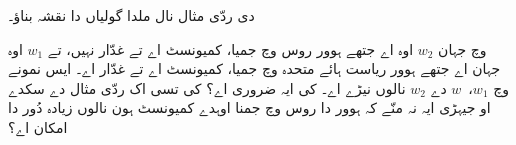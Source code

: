 \documentclass[../../../include/open-logic-section]{subfiles}
\begin{document}
\begin{prob}
 دی ردّی مثال نال ملدا گولیاں دا نقشہ بناؤ۔
\end{prob}

\begin{prob}
   وچ جہان $w_2$ اوہ اے جتھے
  ہوور روس وچ جمیا، کمیونسٹ اے تے غدّار نہیں، تے $w_1$ اوہ جہان اے جتھے
  ہوور ریاست ہائے متحدہ وچ جمیا، کمیونسٹ اے تے غدّار اے۔ ایس نمونے وچ
  $w_1$،~$w$ دے $w_2$ نالوں نیڑے اے۔ کی ایہ ضروری اے؟ کی تسی اک ردّی
  مثال دے سکدے او جیہڑی ایہ نہ منّے کہ ہوور دا روس وچ جمنا اوہدے
  کمیونسٹ ہون نالوں زیادہ دُور دا امکان اے؟
\end{prob}
\end{document}
